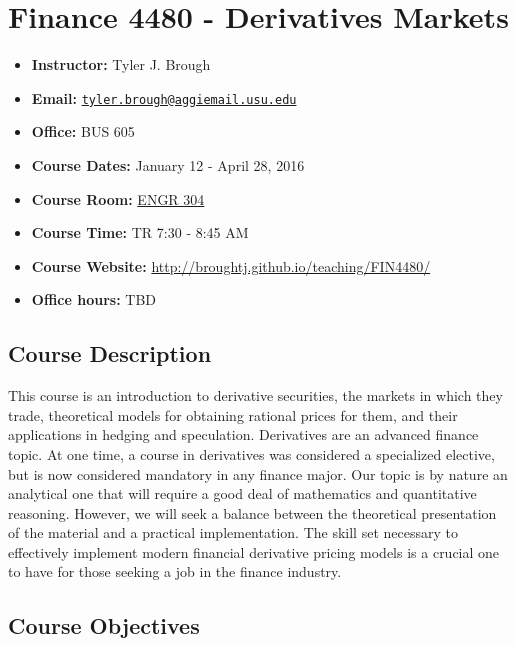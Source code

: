\documentclass[]{article}
\date{}
\begin{document}
\section{Finance 4480 - Derivatives
Markets}\label{finance-4480---derivatives-markets}

\begin{itemize}
 \itemsep1pt\parskip0pt
 \item \textbf{Instructor:} Tyler J. Brough
 \item \textbf{Email:} \href{mailto:tyler.brough@aggiemail.usu.edu}{\nolinkurl{tyler.brough@aggiemail.usu.edu}}
 \item \textbf{Office:} BUS 605
 \item \textbf{Course Dates:} January 12 - April 28, 2016
 \item \textbf{Course Room:} \href{https://www.usu.edu/map/index.cfm?id=32}{ENGR 304}
 \item \textbf{Course Time:} TR 7:30 - 8:45 AM
 \item \textbf{Course Website:} \href{http://broughtj.github.io/teaching/FIN4480/}{http://broughtj.github.io/teaching/FIN4480/}  
 \item \textbf{Office hours:} TBD
\end{itemize}

\subsection{Course Description}\label{course-description}

This course is an introduction to derivative securities, the markets in
which they trade, theoretical models for obtaining rational prices for
them, and their applications in hedging and speculation. Derivatives are
an advanced finance topic. At one time, a course in derivatives was
considered a specialized elective, but is now considered mandatory in
any finance major. Our topic is by nature an analytical one that will
require a good deal of mathematics and quantitative reasoning. However,
we will seek a balance between the theoretical presentation of the
material and a practical implementation. The skill set necessary to
effectively implement modern financial derivative pricing models is a
crucial one to have for those seeking a job in the finance industry.

\subsection{Course Objectives}\label{course-objectives}
\end{document}
